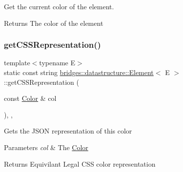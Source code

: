 Get the current color of the element. 

\begin{DoxyReturn}{Returns}
The color of the element 
\end{DoxyReturn}
\mbox{\label{classbridges_1_1datastructure_1_1_element_afc6de63b836064024721d72b7ffa52bf}} 
\subsubsection{\texorpdfstring{get\+C\+S\+S\+Representation()}{getCSSRepresentation()}}
{\footnotesize\ttfamily template$<$typename E$>$ \\
static const string \mbox{\hyperlink{classbridges_1_1datastructure_1_1_element}{bridges\+::datastructure\+::\+Element}}$<$ E $>$\+::get\+C\+S\+S\+Representation (\begin{DoxyParamCaption}\item[{const \mbox{\hyperlink{classbridges_1_1datastructure_1_1_color}{Color}} \&}]{col }\end{DoxyParamCaption})\hspace{0.3cm}{\ttfamily [inline]}, {\ttfamily [static]}, {\ttfamily [protected]}}

Gets the J\+S\+ON representation of this color


\begin{DoxyParams}{Parameters}
{\em col} & The \mbox{\hyperlink{classbridges_1_1datastructure_1_1_color}{Color}} \\
\hline
\end{DoxyParams}
\begin{DoxyReturn}{Returns}
Equivilant Legal C\+SS color representation 
\end{DoxyReturn}
\mbox{\label{classbridges_1_1datastructure_1_1_element_a285fc51d6dfcb8bff2d72f7e4addfe6d}} 
